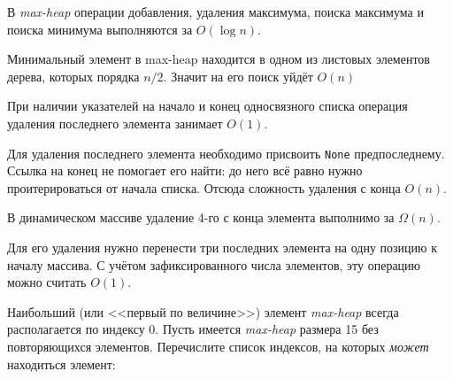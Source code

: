 \documentclass[12pt]{exam}
\begin{document}
\begin{questions}
\begin{checkboxes}
        \choice В {\em max-heap} операции добавления, удаления максимума, поиска максимума и поиска минимума выполняются за $O(\log n)$.
        \begin{solution}
        Минимальный элемент в max-heap находится в одном из листовых элементов дерева, которых порядка $n/2$. Значит на его поиск уйдёт $O(n)$
        \end{solution}

    \choice При наличии указателей на начало и конец односвязного списка операция удаления последнего элемента занимает $O(1)$.
    \begin{solution}
    Для удаления последнего элемента необходимо присвоить {\tt None} предпоследнему. Ссылка на конец не помогает его найти: до него всё равно нужно проитерироваться от начала списка. Отсюда сложность удаления с конца $O(n)$.
    \end{solution}

    \choice В динамическом массиве удаление 4-го с конца элемента выполнимо за $\Omega(n)$.
    \begin{solution}
    Для его удаления нужно перенести три последних элемента на одну позицию к началу массива. С учётом зафиксированного числа элементов, эту операцию можно считать $O(1)$.
    \end{solution}
\end{checkboxes}


\question
Наибольший (или <<первый по величине>>) элемент {\em max-heap} всегда располагается по индексу $0$. Пусть имеется {\em max-heap} размера 15 без повторяющихся элементов. Перечислите список индексов, на которых {\em может} находиться элемент:
\begin{parts}

\end{parts}
\end{questions}
\end{document}
